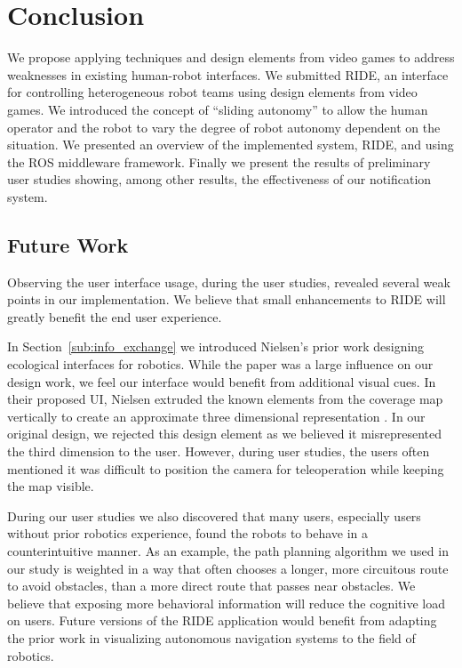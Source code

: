 \chapter{Conclusion}

We propose applying techniques and design elements from video games to address weaknesses in existing human-robot interfaces. We submitted RIDE, an interface for controlling heterogeneous robot teams using design elements from video games. We introduced the concept of ``sliding autonomy'' to allow the human operator and the robot to vary the degree of robot autonomy dependent on the situation. We presented an overview of the implemented system, RIDE, and using the ROS middleware framework. Finally we present the results of preliminary user studies showing, among other results, the effectiveness of our notification system.

\section{Future Work}
\label{section:futurework}
Observing the user interface usage, during the user studies, revealed several weak points in our implementation. We believe that small enhancements to RIDE will greatly benefit the end user experience.

In Section~\ref{sub:info_exchange} we introduced Nielsen's prior work designing ecological interfaces for robotics. While the paper was a large influence on our design work, we feel our interface would benefit from additional visual cues. In their proposed UI, Nielsen extruded the known elements from the coverage map vertically to create an approximate three dimensional representation \cite{Nielsen_Teleoperation}. In our original design, we rejected this design element as we believed it misrepresented the third dimension to the user. However, during user studies, the users often mentioned it was difficult to position the camera for teleoperation while keeping the map visible.

During our user studies we also discovered that many users, especially users without prior robotics experience, found the robots to behave in a counterintuitive manner. As an example, the path planning algorithm we used in our study is weighted in a way that often chooses a longer, more circuitous route to avoid obstacles, than a more direct route that passes near obstacles. We believe that exposing more behavioral information will reduce the cognitive load on users. Future versions of the RIDE application would benefit from adapting the prior work in visualizing autonomous navigation systems to the field of robotics.


